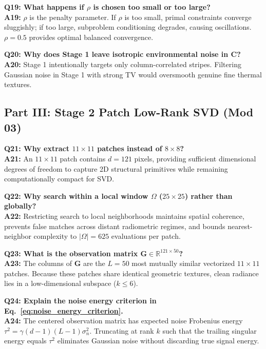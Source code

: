 \documentclass[10pt,conference]{IEEEtran}
\begin{document}
\vspace{0.4em}\noindent\textbf{Q19: What happens if $\rho$ is chosen too small or too large?}\\
\textbf{A19:} $\rho$ is the penalty parameter. If $\rho$ is too small, primal constraints converge sluggishly; if too large, subproblem conditioning degrades, causing oscillations. $\rho = 0.5$ provides optimal balanced convergence.

\vspace{0.4em}\noindent\textbf{Q20: Why does Stage 1 leave isotropic environmental noise in $\mathbf{C}$?}\\
\textbf{A20:} Stage 1 intentionally targets only column-correlated stripes. Filtering Gaussian noise in Stage 1 with strong TV would oversmooth genuine fine thermal textures.

\subsection{Part III: Stage 2 Patch Low-Rank SVD (Mod 03)}

\noindent\textbf{Q21: Why extract $11 \times 11$ patches instead of $8 \times 8$?}\\
\textbf{A21:} An $11 \times 11$ patch contains $d = 121$ pixels, providing sufficient dimensional degrees of freedom to capture 2D structural primitives while remaining computationally compact for SVD.

\vspace{0.4em}\noindent\textbf{Q22: Why search within a local window $\Omega$ ($25 \times 25$) rather than globally?}\\
\textbf{A22:} Restricting search to local neighborhoods maintains spatial coherence, prevents false matches across distant radiometric regimes, and bounds nearest-neighbor complexity to $|\Omega| = 625$ evaluations per patch.

\vspace{0.4em}\noindent\textbf{Q23: What is the observation matrix $\mathbf{G} \in \mathbb{R}^{121 \times 50}$?}\\
\textbf{A23:} The columns of $\mathbf{G}$ are the $L = 50$ most mutually similar vectorized $11 \times 11$ patches. Because these patches share identical geometric textures, clean radiance lies in a low-dimensional subspace ($k \le 6$).

\vspace{0.4em}\noindent\textbf{Q24: Explain the noise energy criterion in Eq.~\ref{eq:noise_energy_criterion}.}\\
\textbf{A24:} The centered observation matrix has expected noise Frobenius energy $\tau^2 = \gamma (d-1)(L-1)\sigma_n^2$. Truncating at rank $k$ such that the trailing singular energy equals $\tau^2$ eliminates Gaussian noise without discarding true signal energy.
\end{document}

